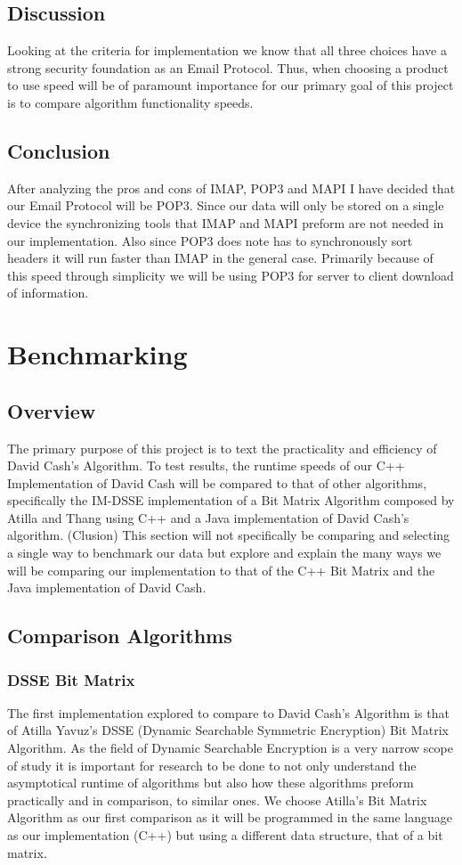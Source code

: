 \subsection{ Discussion }
Looking at the criteria for implementation we know that all three choices have a strong security foundation as an Email Protocol. Thus, when choosing a product to use speed will be of paramount importance for our primary goal of this project is to compare algorithm functionality speeds.
\subsection{ Conclusion }
After analyzing the pros and cons of IMAP, POP3 and MAPI I have decided that our Email Protocol will be POP3. Since our data will only be stored on a single device the synchronizing tools that IMAP and MAPI preform are not needed in our implementation. Also since POP3 does note has to synchronously sort headers it will run faster than IMAP in the general case. Primarily because of this speed through simplicity we will be using POP3 for server to client download of information.



\section{ Benchmarking }

\subsection{ Overview }
The primary purpose of this project is to text the practicality and efficiency of David Cash’s Algorithm. To test results, the runtime speeds of our C++ Implementation of David Cash will be compared to that of other algorithms, specifically the IM-DSSE implementation of a Bit Matrix Algorithm composed by Atilla and Thang using C++  and a Java implementation of David Cash’s algorithm. (Clusion) This section will not specifically be comparing and selecting a single way to benchmark our data but explore and explain the many ways we will be comparing our implementation to that of the C++ Bit Matrix and the Java implementation of David Cash.

\subsection{ Comparison Algorithms }
\subsubsection{ DSSE Bit Matrix}
The first implementation explored to compare to David Cash’s Algorithm is that of Atilla Yavuz’s DSSE (Dynamic Searchable Symmetric Encryption) Bit Matrix Algorithm. As the field of Dynamic Searchable Encryption is a very narrow scope of study it is important for research to be done to not only understand the asymptotical runtime of algorithms but also how these algorithms preform practically and in comparison, to similar ones. We choose Atilla’s Bit Matrix Algorithm as our first comparison as it will be programmed in the same language as our implementation (C++) but using a different data structure, that of a bit matrix. 
